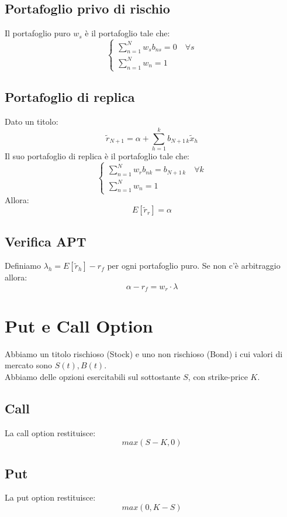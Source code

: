 \documentclass[a4paper,notitlepage]{report}%
\begin{document}
\begin{multicols*}{2}
    \subsection*{Portafoglio privo di rischio}
    Il portafoglio puro $w_s$ è il portafoglio tale che:
    \[
        \left\{\begin{array}{l}
            \sum_{n=1}^N w_s b_{ns} = 0 \quad \forall s \\
            \sum_{n=1}^N w_n  = 1
        \end{array}\right.  
    \]

    \subsection*{Portafoglio di replica}
    Dato un titolo:
    \[
        \tilde{r}_{N+1} = \alpha + \sum_{h=1}^k b_{N+1 \, k}\tilde{x}_h
    \]
    Il suo portafoglio di replica è il portafoglio tale che:
    \[
        \left\{\begin{array}{l}
            \sum_{n=1}^N w_r b_{nk} = b_{N+1 \, k} \quad \forall k\\
            \sum_{n=1}^N w_n  = 1
        \end{array}\right.  
    \]
    Allora:
    \[
        E[\tilde{r}_r] = \alpha    
    \]

    \subsection*{Verifica APT}
    Definiamo $\lambda_h = E[\tilde{r}_h]-r_f$ per ogni portafoglio puro.
    Se non c'è arbitraggio allora:
    \[
        \alpha-r_f = w_r \cdot \lambda    
    \]


\section*{Put e Call Option}
    Abbiamo un titolo rischioso (Stock) e uno non rischioso (Bond)
    i cui valori di mercato sono $S(t), B(t)$. \\
    Abbiamo delle opzioni esercitabili sul sottostante $S$,
    con strike-price $K$.
    \subsection*{Call}
    La call option restituisce:
    \[
        max(S-K,0)
    \]
    \subsection*{Put}
    La put option restituisce:
    \[
        max(0,K-S)
    \]


\end{multicols*}
\end{document}
